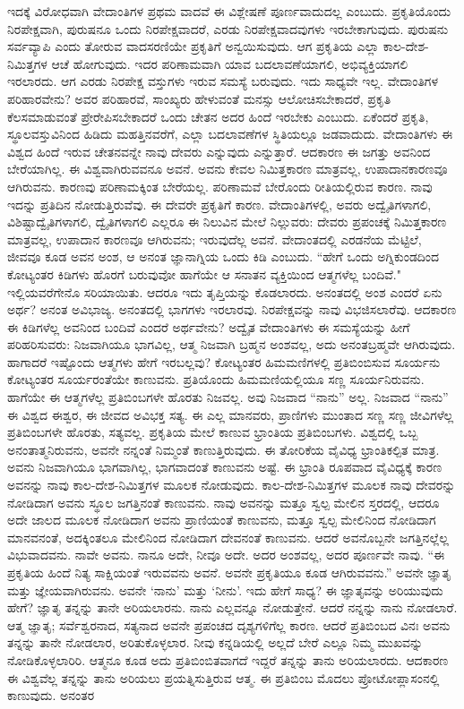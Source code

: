 ಇದಕ್ಕೆ ವಿರೋಧವಾಗಿ ವೇದಾಂತಿಗಳ ಪ್ರಥಮ ವಾದವೆ ಈ ವಿಶ್ಲೇಷಣೆ ಪೂರ್ಣವಾದುದಲ್ಲ ಎಂಬುದು. ಪ್ರಕೃತಿಯೊಂದು ನಿರಪೇಕ್ಷವಾಗಿ, ಪುರುಷನೂ ಒಂದು ನಿರಪೇಕ್ಷವಾದರೆ, ಎರಡು ನಿರಪೇಕ್ಷವಾದವುಗಳು ಇರಬೇಕಾಗುವುದು. ಪುರುಷನು ಸರ್ವವ್ಯಾಪಿ ಎಂದು ತೋರುವ ವಾದಸರಣಿಯೇ ಪ್ರಕೃತಿಗೆ ಅನ್ವಯಿಸುವುದು. ಆಗ ಪ್ರಕೃತಿಯ ಎಲ್ಲಾ ಕಾಲ-ದೇಶ-ನಿಮಿತ್ತಗಳ ಆಚೆ ಹೋಗುವುದು. ಇದರ ಪರಿಣಾಮವಾಗಿ ಯಾವ ಬದಲಾವಣೆಯಾಗಲಿ, ಅಭಿವ್ಯಕ್ತಿಯಾಗಲಿ ಇರಲಾರದು. ಆಗ ಎರಡು ನಿರಪೇಕ್ಷ ವಸ್ತುಗಳು ಇರುವ ಸಮಸ್ಯೆ ಬರುವುದು. ಇದು ಸಾಧ್ಯವೇ ಇಲ್ಲ. ವೇದಾಂತಿಗಳ ಪರಿಹಾರವೇನು? ಅವರ ಪರಿಹಾರವೆ, ಸಾಂಖ್ಯರು ಹೇಳುವಂತೆ ಮನಸ್ಸು ಆಲೋಚಿಸಬೇಕಾದರೆ, ಪ್ರಕೃತಿ ಕೆಲಸಮಾಡುವಂತೆ ಪ್ರೇರೇಪಿಸಬೇಕಾದರೆ ಒಂದು ಚೇತನ ಅದರ ಹಿಂದೆ ಇರಬೇಕು ಎಂಬುದು. ಏಕೆಂದರೆ ಪ್ರಕೃತಿ, ಸ್ಥೂಲವಸ್ತುವಿನಿಂದ ಹಿಡಿದು ಮಹತ್ತಿನವರೆಗೆ, ಎಲ್ಲಾ ಬದಲಾವಣೆಗಳ ಸ್ಥಿತಿಯಲ್ಲೂ ಜಡವಾದುದು. ವೇದಾಂತಿಗಳು ಈ ವಿಶ್ವದ ಹಿಂದೆ ಇರುವ ಚೇತನವನ್ನೇ ನಾವು ದೇವರು ಎನ್ನುವುದು ಎನ್ನುತ್ತಾರೆ. ಆದಕಾರಣ ಈ ಜಗತ್ತು ಅವನಿಂದ ಬೇರೆಯಾಗಿಲ್ಲ. ಈ ವಿಶ್ವವಾಗಿರುವವನೂ ಅವನೆ. ಅವನು ಕೇವಲ ನಿಮಿತ್ತಕಾರಣ ಮಾತ್ರವಲ್ಲ, ಉಪಾದಾನಕಾರಣವೂ ಆಗಿರುವನು. ಕಾರಣವು ಪರಿಣಾಮಕ್ಕಿಂತ ಬೇರೆಯಲ್ಲ. ಪರಿಣಾಮವೆ ಬೇರೊಂದು ರೀತಿಯಲ್ಲಿರುವ ಕಾರಣ. ನಾವು ಇದನ್ನು ಪ್ರತಿದಿನ ನೋಡುತ್ತಿರುವೆವು. ಈ ದೇವರೇ ಪ್ರಕೃತಿಗೆ ಕಾರಣ. ವೇದಾಂತಿಗಳಲ್ಲಿ, ಅವರು ಅದ್ವೈತಿಗಳಾಗಲಿ, ವಿಶಿಷ್ಟಾದ್ವೈತಿಗಳಾಗಲಿ, ದ್ವೈತಿಗಳಾಗಲಿ ಎಲ್ಲರೂ ಈ ನಿಲುವಿನ ಮೇಲೆ ನಿಲ್ಲುವರು: ದೇವರು ಪ್ರಪಂಚಕ್ಕೆ ನಿಮಿತ್ತಕಾರಣ ಮಾತ್ರವಲ್ಲ, ಉಪಾದಾನ ಕಾರಣವೂ ಆಗಿರುವನು; ಇರುವುದೆಲ್ಲ ಅವನೆ. ವೇದಾಂತದಲ್ಲಿ ಎರಡನೆಯ ಮೆಟ್ಟಿಲೆ, ಜೀವವೂ ಕೂಡ ಅವನ ಅಂಶ, ಆ ಅನಂತ ಜ್ಞಾನಾಗ್ನಿಯ ಒಂದು ಕಿಡಿ ಎಂಬುದು. “ಹೇಗೆ ಒಂದು ಅಗ್ನಿಕುಂಡದಿಂದ ಕೋಟ್ಯಂತರ ಕಿಡಿಗಳು ಹೊರಗೆ ಬರುವುವೋ ಹಾಗೆಯೇ ಆ ಸನಾತನ ವ್ಯಕ್ತಿಯಿಂದ ಆತ್ಮಗಳೆಲ್ಲ ಬಂದಿವೆ." ಇಲ್ಲಿಯವರೆಗೇನೊ ಸರಿಯಾಯಿತು. ಆದರೂ ಇದು ತೃಪ್ತಿಯನ್ನು ಕೊಡಲಾರದು. ಅನಂತದಲ್ಲಿ ಅಂಶ ಎಂದರೆ ಏನು ಅರ್ಥ? ಅನಂತ ಅವಿಭಾಜ್ಯ. ಅನಂತದಲ್ಲಿ ಭಾಗಗಳು ಇರಲಾರವು. ನಿರಪೇಕ್ಷವನ್ನು ನಾವು ವಿಭಜಿಸಲಾರೆವು. ಆದಕಾರಣ ಈ ಕಿಡಿಗಳೆಲ್ಲ ಅವನಿಂದ ಬಂದಿವೆ ಎಂದರೆ ಅರ್ಥವೇನು? ಅದ್ವೈತ ವೇದಾಂತಿಗಳು ಈ ಸಮಸ್ಯೆಯನ್ನು ಹೀಗೆ ಪರಿಹರಿಸುವರು: ನಿಜವಾಗಿಯೂ ಭಾಗವಿಲ್ಲ, ಆತ್ಮ ನಿಜವಾಗಿ ಬ್ರಹ್ಮನ ಅಂಶವಲ್ಲ, ಅದು ಅನಂತಬ್ರಹ್ಮವೇ ಆಗಿರುವುದು. ಹಾಗಾದರೆ ಇಷ್ಟೊಂದು ಆತ್ಮಗಳು ಹೇಗೆ ಇರಬಲ್ಲವು? ಕೋಟ್ಯಂತರ ಹಿಮಮಣಿಗಳಲ್ಲಿ ಪ್ರತಿಬಿಂಬಿಸುವ ಸೂರ್ಯನು ಕೋಟ್ಯಂತರ ಸೂರ್ಯರಂತೆಯೇ ಕಾಣುವನು. ಪ್ರತಿಯೊಂದು ಹಿಮಮಣಿಯಲ್ಲಿಯೂ ಸಣ್ಣ ಸೂರ್ಯನಿರುವನು. ಹಾಗೆಯೇ ಈ ಆತ್ಮಗಳೆಲ್ಲ ಪ್ರತಿಬಿಂಬಗಳೇ ಹೊರತು ನಿಜವಲ್ಲ. ಅವು ನಿಜವಾದ “ನಾನು'' ಅಲ್ಲ. ನಿಜವಾದ “ನಾನು'' ಈ ವಿಶ್ವದ ಈಶ್ವರ, ಈ ಜೀವದ ಅವಿಭಕ್ತ ಸತ್ಯ. ಈ ಎಲ್ಲ ಮಾನವರು, ಪ್ರಾಣಿಗಳು ಮುಂತಾದ ಸಣ್ಣ ಸಣ್ಣ ಜೀವಿಗಳೆಲ್ಲ ಪ್ರತಿಬಿಂಬಗಳೇ ಹೊರತು, ಸತ್ಯವಲ್ಲ. ಪ್ರಕೃತಿಯ ಮೇಲೆ ಕಾಣುವ ಭ್ರಾಂತಿಯ ಪ್ರತಿಬಿಂಬಗಳು. ವಿಶ್ವದಲ್ಲಿ ಒಬ್ಬ ಅನಂತಾತ್ಮನಿರುವನು, ಅವನೇ ನನ್ನಂತೆ ನಿಮ್ಮಂತೆ ಕಾಣುತ್ತಿರುವುದು. ಈ ತೋರಿಕೆಯ ವೈವಿಧ್ಯ ಭ್ರಾಂತಿಕಲ್ಪಿತ ಮಾತ್ರ. ಅವನು ನಿಜವಾಗಿಯೂ ಭಾಗವಾಗಿಲ್ಲ, ಭಾಗವಾದಂತೆ ಕಾಣುವನು ಅಷ್ಟೆ. ಈ ಭ್ರಾಂತಿ ರೂಪವಾದ ವೈವಿಧ್ಯಕ್ಕೆ ಕಾರಣ ಅವನನ್ನು ನಾವು ಕಾಲ-ದೇಶ-ನಿಮಿತ್ತಗಳ ಮೂಲಕ ನೋಡುವುದು. ಕಾಲ-ದೇಶ-ನಿಮಿತ್ತಗಳ ಮೂಲಕ ನಾವು ದೇವರನ್ನು ನೋಡಿದಾಗ ಅವನು ಸ್ಥೂಲ ಜಗತ್ತಿನಂತೆ ಕಾಣುವನು. ನಾವು ಅವನನ್ನು ಮತ್ತೂ ಸ್ವಲ್ಪ ಮೇಲಿನ ಸ್ತರದಲ್ಲಿ, ಆದರೂ ಅದೇ ಜಾಲದ ಮೂಲಕ ನೋಡಿದಾಗ ಅವನು ಪ್ರಾಣಿಯಂತೆ ಕಾಣುವನು, ಮತ್ತೂ ಸ್ವಲ್ಪ ಮೇಲಿನಿಂದ ನೋಡಿದಾಗ ಮಾನವನಂತೆ, ಅದಕ್ಕಿಂತಲೂ ಮೇಲಿನಿಂದ ನೋಡಿದಾಗ ದೇವನಂತೆ ಕಾಣುವನು. ಆದರೆ ಅವನೊಬ್ಬನೇ ಜಗತ್ತಿನಲ್ಲೆಲ್ಲ ವಿಭುವಾದವನು. ನಾವೇ ಅವನು. ನಾನೂ ಅದೇ, ನೀವೂ ಅದೇ. ಅದರ ಅಂಶವಲ್ಲ, ಅದರ ಪೂರ್ಣವೇ ನಾವು. “ಈ ಪ್ರಕೃತಿಯ ಹಿಂದೆ ನಿತ್ಯ ಸಾಕ್ಷಿಯಂತೆ ಇರುವವನು ಅವನೆ. ಅವನೇ ಪ್ರಕೃತಿಯೂ ಕೂಡ ಆಗಿರುವವನು.” ಅವನೇ ಜ್ಞಾತೃ ಮತ್ತು ಜ್ಞೇಯವಾಗಿರುವನು. ಅವನೇ `ನಾನು' ಮತ್ತು `ನೀನು'. ಇದು ಹೇಗೆ ಸಾಧ್ಯ? ಈ ಜ್ಞಾತೃವನ್ನು ಅರಿಯುವುದು ಹೇಗೆ? ಜ್ಞಾತೃ ತನ್ನನ್ನು ತಾನೇ ಅರಿಯಲಾರನು. ನಾನು ಎಲ್ಲವನ್ನೂ ನೋಡುತ್ತೇನೆ. ಆದರೆ ನನ್ನನ್ನು ನಾನು ನೋಡಲಾರೆ. ಆತ್ಮ ಜ್ಞಾತೃ; ಸರ್ವೆಶ್ವರನಾದ, ಸತ್ಯನಾದ ಅವನೇ ಪ್ರಪಂಚದ ದೃಶ್ಯಗಳಿಗೆಲ್ಲ ಕಾರಣ. ಆದರೆ ಪ್ರತಿಬಿಂಬದ ವಿನಃ ಅವನು ತನ್ನನ್ನು ತಾನೇ ನೋಡಲಾರ, ಅರಿತುಕೊಳ್ಳಲಾರ. ನೀವು ಕನ್ನಡಿಯಲ್ಲಿ ಅಲ್ಲದೆ ಬೇರೆ ಎಲ್ಲೂ ನಿಮ್ಮ ಮುಖವನ್ನು ನೋಡಿಕೊಳ್ಳಲಾರಿರಿ. ಆತ್ಮನೂ ಕೂಡ ಅದು ಪ್ರತಿಬಿಂಬಿತವಾಗದೆ ಇದ್ದರೆ ತನ್ನನ್ನು ತಾನು ಅರಿಯಲಾರದು. ಆದಕಾರಣ ಈ ವಿಶ್ವವೆಲ್ಲ ತನ್ನನ್ನು ತಾನು ಅರಿಯಲು ಪ್ರಯತ್ನಿಸುತ್ತಿರುವ ಆತ್ಮ. ಈ ಪ್ರತಿಬಿಂಬ ಮೊದಲು ಪ್ರೋಟೋಪ್ಲಾಸಂನಲ್ಲಿ ಕಾಣುವುದು. ಅನಂತರ 